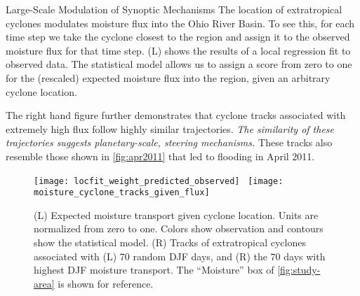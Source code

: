 \begin{block}{Large-Scale Modulation of Synoptic Mechanisms}
    The location of extratropical cyclones modulates moisture flux into the Ohio River Basin.
    To see this, for each time step we take the cyclone closest to the region and assign it to the observed moisture flux for that time step.
     (L) shows the results of a local regression \cite{Loader1999} fit to observed data.
    The statistical model allows us to assign a score from zero to one for the (rescaled) expected moisture flux into the region, given an arbitrary cyclone location.

    The right hand figure further demonstrates that cyclone tracks associated with extremely high flux follow highly similar trajectories.
    \emph{The similarity of these trajectories suggests planetary-scale, steering mechanisms.}
    These tracks also resemble those shown in \cref{fig:apr2011} that led to flooding in April 2011.
    \begin{figure}
        \texttt{[image: locfit\_weight\_predicted\_observed]}~
        \texttt{[image: moisture\_cyclone\_tracks\_given\_flux]}
        \caption{(L) Expected moisture transport given cyclone location. Units are normalized from zero to one. Colors show observation and contours show the statistical model.
                (R) Tracks of extratropical cyclones associated with (L) 70 random DJF days, and (R) the 70 days with highest DJF moisture transport. The ``Moisture'' box of \cref{fig:study-area} is shown for reference.}
        \label{fig:track-given-flux}
    \end{figure}
\end{block}
